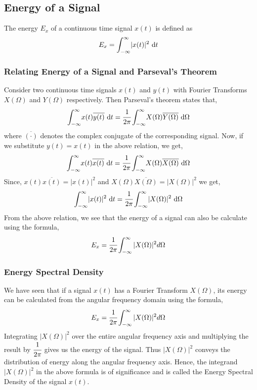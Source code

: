 \subsection{Energy of a Signal}
	The energy $E_x$ of a continuous time signal $x(t)$ is defined as
	\begin{equation*}
		E_x = \int_{-\infty}^{\infty} \! |x(t)|^2 \ \mathrm{d} t
	\end{equation*}
	\subsubsection{Relating Energy of a Signal and Parseval's Theorem}
		Consider two continuous time signals $x(t)$ and $y(t)$ with Fourier Transforms $X(\Omega)$ and $Y(\Omega)$ respectively. Then Parseval's theorem states that,
		\begin{equation*}
			\int_{-\infty}^{\infty} \! x(t)\overline{y(t)}\ \dm t = \cfrac{1}{2\pi}\int_{-\infty}^{\infty} \! X(\Omega)\overline{Y(\Omega)} \ \dm \Omega
		\end{equation*}
		\noindent
		where $\overline{(\cdot)}$ denotes the complex conjugate of the corresponding signal.
		\noindent
		Now, if we substitute $y(t) = x(t)$ in the above relation, we get,
		\begin{equation*}
			\int_{-\infty}^{\infty} \! x(t)\overline{x(t)} \ \dm t = \cfrac{1}{2\pi}\int_{-\infty}^{\infty} \! X(\Omega)\overline{X(\Omega)} \ \dm \Omega
		\end{equation*}
		Since, $x(t)\overline{x(t)} = |x(t)|^2$ and $X(\Omega)\overline{X(\Omega)} = |X(\Omega)|^2$ we get,
		\begin{equation*}
			\int_{-\infty}^{\infty} \! |x(t)|^2 \ \mathrm{d} t = \cfrac{1}{2\pi}\int_{-\infty}^{\infty} \! |X(\Omega)|^2 \ \mathrm{d} \Omega
		\end{equation*}
		\noindent
		From the above relation, we see that the energy of a signal can also be calculate using the formula,
		\begin{equation*}
		E_x = \cfrac{1}{2\pi}\int_{-\infty}^{\infty}|X(\Omega)|^2d\Omega
		\end{equation*}
	\subsubsection{Energy Spectral Density}
		We have seen that if a signal $x(t)$ has a Fourier Transform $X(\Omega)$, its energy can be calculated from the angular frequency domain using the formula,
		\begin{equation*}
			E_x = \cfrac{1}{2\pi}\int_{-\infty}^{\infty}|X(\Omega)|^2d\Omega
		\end{equation*}
		Integrating $|X(\Omega)|^2$ over the entire angular frequency axis and multiplying the result by $\cfrac{1}{2\pi}$ gives us the energy of the signal. Thus $|X(\Omega)|^2$ conveys the distribution of energy along the angular frequency axis. Hence, the integrand $|X(\Omega)|^2$ in the above formula is of significance and is called the Energy Spectral Density of the signal $x(t)$.
